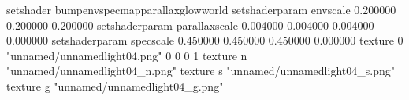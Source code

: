 setshader bumpenvspecmapparallaxglowworld
setshaderparam envscale 0.200000 0.200000 0.200000
setshaderparam parallaxscale 0.004000 0.004000 0.004000 0.000000
setshaderparam specscale 0.450000 0.450000 0.450000 0.000000
texture 0 "unnamed/unnamedlight04.png" 0 0 0 1
texture n "unnamed/unnamedlight04_n.png"
texture s "unnamed/unnamedlight04_s.png"
texture g "unnamed/unnamedlight04_g.png"